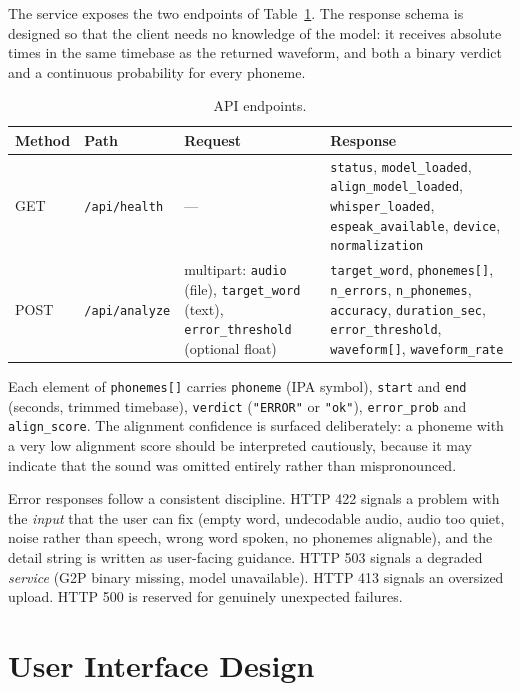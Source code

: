 The service exposes the two endpoints of Table~\ref{tab:api}. The response
schema is designed so that the client needs no knowledge of the model: it
receives absolute times in the same timebase as the returned waveform, and both
a binary verdict and a continuous probability for every phoneme.

\begin{table}[H]
\centering
\caption[API endpoints]{API endpoints.}
\label{tab:api}
\small
\begin{tabularx}{\textwidth}{@{}p{1.5cm}p{2.4cm}p{3.3cm}X@{}}
\toprule
\textbf{Method} & \textbf{Path} & \textbf{Request} & \textbf{Response} \\
\midrule
GET  & \texttt{/api/health}  & --- & \texttt{status}, \texttt{model\_loaded}, \texttt{align\_model\_loaded}, \texttt{whisper\_loaded}, \texttt{espeak\_available}, \texttt{device}, \texttt{normalization} \\
POST & \texttt{/api/analyze} & multipart: \texttt{audio} (file), \texttt{target\_word} (text), \texttt{error\_threshold} (optional float) & \texttt{target\_word}, \texttt{phonemes[]}, \texttt{n\_errors}, \texttt{n\_phonemes}, \texttt{accuracy}, \texttt{duration\_sec}, \texttt{error\_threshold}, \texttt{waveform[]}, \texttt{waveform\_rate} \\
\bottomrule
\end{tabularx}
\end{table}

Each element of \texttt{phonemes[]} carries \texttt{phoneme} (IPA symbol),
\texttt{start} and \texttt{end} (seconds, trimmed timebase), \texttt{verdict}
(\texttt{"ERROR"} or \texttt{"ok"}), \texttt{error\_prob} and
\texttt{align\_score}. The alignment confidence is surfaced deliberately: a
phoneme with a very low alignment score should be interpreted cautiously,
because it may indicate that the sound was omitted entirely rather than
mispronounced.

Error responses follow a consistent discipline. HTTP 422 signals a problem with
the \emph{input} that the user can fix (empty word, undecodable audio, audio too
quiet, noise rather than speech, wrong word spoken, no phonemes alignable), and
the detail string is written as user-facing guidance. HTTP 503 signals a
degraded \emph{service} (G2P binary missing, model unavailable). HTTP 413 signals
an oversized upload. HTTP 500 is reserved for genuinely unexpected failures.

\section{User Interface Design}
\label{sec:ui-design}

